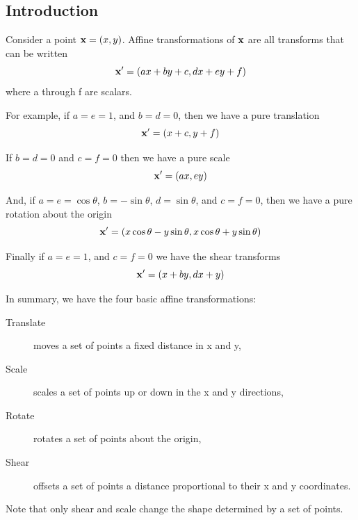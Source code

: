 \documentclass[11pt]{amsart}
\begin{document}
\subsection{Introduction}
Consider a point ${\bf x} = (x, y)$. Affine transformations of $\bf x$ are all transforms that can be
written
\begin{equation}
{\bf x'} = (ax + by + c, dx + ey + f)
\end{equation}
where a through f are scalars.

For example, if $a = e = 1$, and $b =  d = 0$, then we have a pure translation
\begin{equation}
{\bf x'} = (x +  c, y + f)
\end{equation}

If $b= d = 0$ and $c= f = 0$ then we have a pure scale
\begin{equation}
{\bf x'} = (ax, ey)
\end{equation}



And, if $a = e = \cos \theta$, $b = -\sin \theta$, $d = \sin \theta$, and $c= f = 0$, then we
have a pure rotation about the origin
\begin{equation}
{\bf x'} = (x \cos \theta -y \sin\theta, x \cos \theta +y \sin\theta)
\end{equation}

Finally if $a=e = 1$, and $c= f = 0$ we have the shear transforms
\begin{equation}
{\bf x'} = (x + by, dx + y)
\end{equation}

In summary, we have the four basic affine transformations:
\begin{description}
\item[Translate] moves a set of points a fixed distance in x and y,
\item[Scale] scales a set of points up or down in the x and y directions,
\item[Rotate] rotates a set of points about the origin,
\item[Shear] offsets a set of points a distance proportional to their x and y coordinates.
\end{description}
Note that only shear and scale change the shape determined by a set of points.
\end{document}
